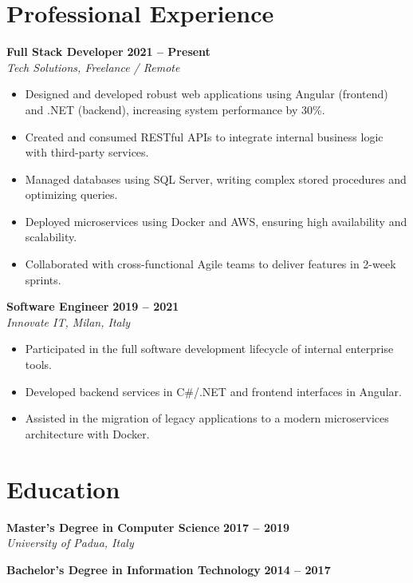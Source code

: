 \documentclass[11pt,a4paper]{article}
\begin{document}
\section*{Professional Experience}
\textbf{Full Stack Developer} \hfill \textbf{2021 -- Present} \\
\textit{Tech Solutions, Freelance / Remote}
\begin{itemize}[leftmargin=*]
    \item Designed and developed robust web applications using Angular (frontend) and .NET (backend), increasing system performance by 30\%.
    \item Created and consumed RESTful APIs to integrate internal business logic with third-party services.
    \item Managed databases using SQL Server, writing complex stored procedures and optimizing queries.
    \item Deployed microservices using Docker and AWS, ensuring high availability and scalability.
    \item Collaborated with cross-functional Agile teams to deliver features in 2-week sprints.
\end{itemize}

\vspace{2mm}
\textbf{Software Engineer} \hfill \textbf{2019 -- 2021} \\
\textit{Innovate IT, Milan, Italy}
\begin{itemize}[leftmargin=*]
    \item Participated in the full software development lifecycle of internal enterprise tools.
    \item Developed backend services in C\#/.NET and frontend interfaces in Angular.
    \item Assisted in the migration of legacy applications to a modern microservices architecture with Docker.
\end{itemize}

\vspace{2mm}
\section*{Education}
\textbf{Master's Degree in Computer Science} \hfill \textbf{2017 -- 2019} \\
\textit{University of Padua, Italy}

\textbf{Bachelor's Degree in Information Technology} \hfill \textbf{2014 -- 2017}
\end{document}
